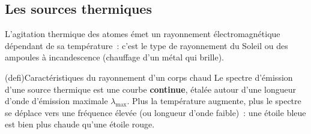 \documentclass[../../main/main.tex]{subfiles}
\begin{document}
\subsection{Les sources thermiques}

L'agitation thermique des atomes émet un rayonnement électromagnétique dépendant
de sa température~: c'est le type de rayonnement du Soleil ou des ampoules à
incandescence (chauffage d'un métal qui brille).

\begin{tcb}(defi){Caractéristiques du rayonnement d'un corps chaud}
	Le spectre d'émission d'une source thermique est une courbe
	\textbf{continue}, étalée autour d'une longueur d'onde d'émission maximale
	$\lambda_{\max}$. Plus la température augmente, plus le spectre se déplace vers
	une fréquence élevée (ou longueur d'onde faible)~: une étoile bleue est bien
	plus chaude qu'une étoile rouge.
\end{tcb}
\end{document}
